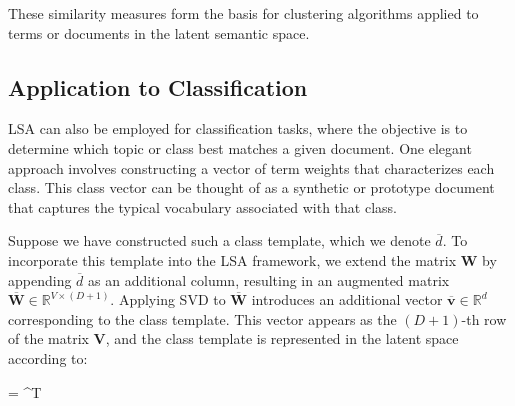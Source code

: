 \begin{figure}
\end{figure}

These similarity measures form the basis for clustering algorithms applied to terms or documents in the latent semantic space.

\subsection*{Application to Classification}

LSA can also be employed for classification tasks, where the objective is to determine which topic or class best matches a given document. One elegant approach involves constructing a vector of term weights that characterizes each class. This class vector can be thought of as a synthetic or prototype document that captures the typical vocabulary associated with that class.

Suppose we have constructed such a class template, which we denote $\overline{d}$. To incorporate this template into the LSA framework, we extend the matrix $\mathbf{W}$ by appending $\overline{d}$ as an additional column, resulting in an augmented matrix $\overline{\mathbf{W}} \in \mathbb{R}^{V \times (D+1)}$. Applying SVD to $\overline{\mathbf{W}}$ introduces an additional vector $\overline{\mathbf{v}} \in \mathbb{R}^d$ corresponding to the class template. This vector appears as the $(D+1)$-th row of the matrix $\mathbf{V}$, and the class template is represented in the latent space according to:
\begin{myequation}
 =  \boldsymbol{\Sigma} ^T
\end{myequation}

